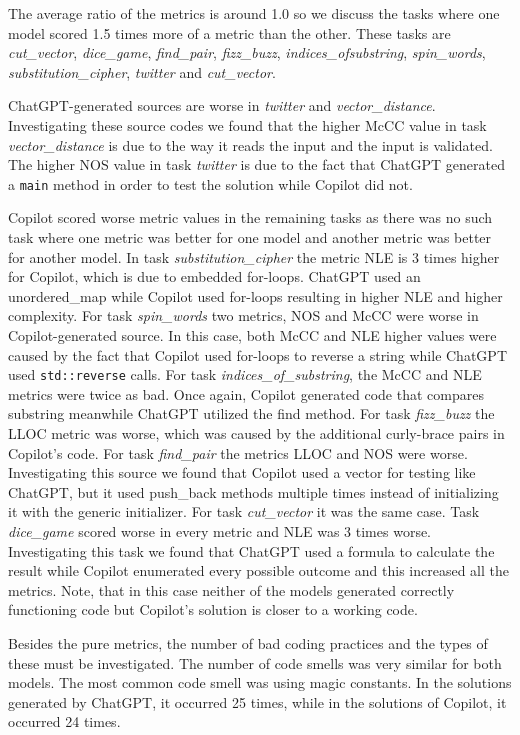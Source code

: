 The average ratio of the metrics is around 1.0 so we discuss the tasks where one model scored 1.5 times more of a metric than the other.
These tasks are \textit{cut\_vector}, \textit{dice\_game}, \textit{find\_pair}, \textit{fizz\_buzz}, \textit{indices\_of\-substring}, \textit{spin\_words}, \textit{substitution\_cipher}, \textit{twitter} and \textit{cut\_vector}.

ChatGPT-generated sources are worse in \textit{twitter} and \textit{vector\_distance}.
Investigating these source codes we found that the higher McCC value in task \textit{vector\_distance} is due to the way it reads the input and the input is validated.
The higher NOS value in task \textit{twitter} is due to the fact that ChatGPT generated a \texttt{main} method in order to test the solution while Copilot did not.

Copilot scored worse metric values in the remaining tasks as there was no such task where one metric was better for one model and another metric was better for another model.
In task \textit{substitution\_cipher} the metric NLE is 3 times higher for Copilot, which is due to embedded for-loops.
ChatGPT used an unordered\_map while Copilot used for-loops resulting in higher NLE and higher complexity.
For task \textit{spin\_words} two metrics, NOS and McCC were worse in Copilot-generated source.
In this case, both McCC and NLE higher values were caused by the fact that Copilot used for-loops to reverse a string while ChatGPT used \texttt{std::reverse} calls.
For task \textit{indices\_of\_substring}, the McCC and NLE metrics were twice as bad.
Once again, Copilot generated code that compares substring meanwhile ChatGPT utilized the find method.
For task \textit{fizz\_buzz} the LLOC metric was worse, which was caused by the additional curly-brace pairs in Copilot's code.
For task \textit{find\_pair} the metrics LLOC and NOS were worse.
Investigating this source we found that Copilot used a vector for testing like ChatGPT, but it used push\_back methods multiple times instead of initializing it with the generic initializer.
For task \textit{cut\_vector} it was the same case.
Task \textit{dice\_game} scored worse in every metric and NLE was 3 times worse.
Investigating this task we found that ChatGPT used a formula to calculate the result while Copilot enumerated every possible outcome and this increased all the metrics.
Note, that in this case neither of the models generated correctly functioning code but Copilot's solution is closer to a working code.


Besides the pure metrics, the number of bad coding practices and the types of these must be investigated.
The number of code smells was very similar for both models.
The most common code smell was using magic constants.
In the solutions generated by ChatGPT, it occurred 25 times, while in the solutions of Copilot, it occurred 24 times.

